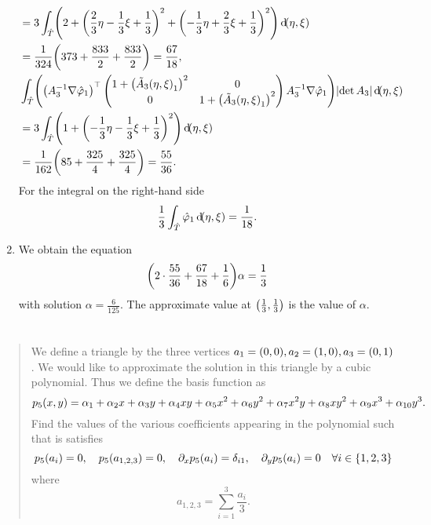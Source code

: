 \documentclass[english]{exercise}
\begin{document}
\begin{enumerate}
\begin{align*}
            &= 3\int_{\hat{T}}\parentheses*{2 + \parentheses*{\frac{2}{3}\eta - \frac{1}{3}\xi + \frac{1}{3}}^2 + \parentheses*{-\frac{1}{3}\eta + \frac{2}{3}\xi + \frac{1}{3}}^2}\d\parentheses*{\eta, \xi}\\
            &= \frac{1}{324}\parentheses*{373 + \frac{833}{2} + \frac{833}{2}} = \frac{67}{18},\\
            &\int_{\hat{T}}\parentheses*{\parentheses*{A_3^{-1}\nabla\hat{\varphi}_1}^\top \begin{pmatrix}
                1 + \parentheses*{\tilde{A}_3\parentheses*{\eta, \xi}_1}^2 & 0\\
                0 & 1 + \parentheses*{\tilde{A}_3\parentheses*{\eta, \xi}_1}^2
            \end{pmatrix}A_3^{-1}\nabla\hat{\varphi}_1}\absolute*{\det A_3}\d\parentheses*{\eta, \xi}\\
            &= 3\int_{\hat{T}}\parentheses*{1 + \parentheses*{-\frac{1}{3}\eta - \frac{1}{3}\xi + \frac{1}{3}}^2}\d\parentheses*{\eta, \xi}\\
            &= \frac{1}{162}\parentheses*{85 + \frac{325}{4} + \frac{325}{4}} = \frac{55}{36}.
        \end{align*}
        For the integral on the right-hand side
        \[
            \frac{1}{3}\int_{\hat{T}}\hat{\varphi}_1 \d\parentheses*{\eta, \xi} = \frac{1}{18}.
        \]
        \item We obtain the equation
        \[
            \parentheses*{2 \cdot \frac{55}{36} + \frac{67}{18} + \frac{1}{6}}\alpha = \frac{1}{3}
        \]
        with solution \(\alpha = \frac{6}{125}\).
        The approximate value at \(\parentheses*{\frac{1}{3}, \frac{1}{3}}\) is the value of \(\alpha\).
    \end{enumerate}
    
    \section{}
    
    \begin{quote}
        We define a triangle by the three vertices \(a_1 = \parentheses*{0, 0}, a_2 = \parentheses*{1, 0}, a_3 = \parentheses*{0, 1}\).
        We would like to approximate the solution in this triangle by a cubic polynomial.
        Thus we define the basis function as
        \[
            p_5\parentheses*{x, y} = \alpha_1 + \alpha_2 x + \alpha_3 y + \alpha_4 xy + \alpha_5 x^2 + \alpha_6 y^2 + \alpha_7 x^2 y + \alpha_8 xy^2 + \alpha_9 x^3 + \alpha_{10}y^3.
        \]
        Find the values of the various coefficients appearing in the polynomial such that is satisfies
        \[
            p_5\parentheses*{a_i} = 0, \quad p_5\parentheses*{a_{1, 2, 3}} = 0, \quad \partial_x p_5\parentheses*{a_i} = \delta_{i1}, \quad \partial_y p_5\parentheses*{a_i} = 0 \quad \forall i \in \braces*{1, 2, 3}
        \]
        where
        \[
            a_{1, 2, 3} = \sum_{i = 1}^3 \frac{a_i}{3}.
        \]
    \end{quote}
\end{document}
